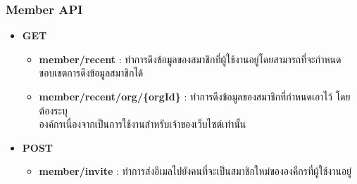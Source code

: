 \subsubsection{Member API}

\ifenglish
\else
\begin{itemize}
    \item \textbf{GET}
    \begin{itemize}
        \item \textbf{member/recent} : ทำการดึงข้อมูลของสมาชิกที่ผู้ใช้งานอยู่โดยสามารถที่จะกำหนดขอบเขตการดึงข้อมูลสมาชิกได้
        \item \textbf{member/recent/org/\{orgId\}} : ทำการดึงข้อมูลของสมาชิกที่กำหนดเอาไว้ โดยต้องระบุ\\องค์กรเนื่องจากเป็นการใช้งานสำหรับเจ้าของเว็บไซต์เท่านั้น
    \end{itemize}
    \item \textbf{POST}
    \begin{itemize}
        \item \textbf{member/invite} : ทำการส่งอีเมลไปยังคนที่จะเป็นสมาชิกใหม่ขององคืกรที่ผู้ใช้งานอยู่
    \end{itemize}
\end{itemize}
\fi